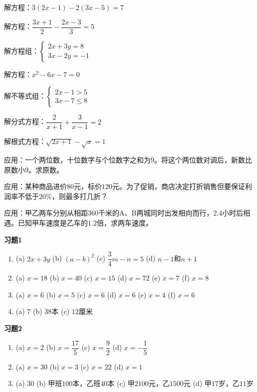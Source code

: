 \documentclass[a4paper,12pt]{ctexart}
\begin{document}
\newpage


\begin{exercise}
\item 解方程：$3(2x-1)-2(3x-5)=7$
\item 解方程：$\dfrac{3x+1}{2}-\dfrac{2x-3}{3}=5$
\item 解方程组：$\begin{cases}2x+3y=8\\3x-2y=-1\end{cases}$
\item 解方程：$x^2-6x-7=0$
\item 解不等式组：$\begin{cases}2x-1>5\\3x-7\le8\end{cases}$
\item 解分式方程：$\dfrac{2}{x+1}+\dfrac{3}{x-1}=2$
\item 解根式方程：$\sqrt{2x+1}-\sqrt{x}=1$
\item 应用：一个两位数，十位数字与个位数字之和为$9$。将这个两位数对调后，新数比原数小$9$。求原数。
\item 应用：某种商品进价$80$元，标价$120$元。为了促销，商店决定打折销售但要保证利润率不低于$20\%$，则最多打几折？
\item 应用：甲乙两车分别从相距$360$千米的A、B两城同时出发相向而行，$2.4$小时后相遇。已知甲车速度是乙车的$1.2$倍，求两车速度。
\end{exercise}

\newpage
{}

\textbf{习题1}
\begin{enumerate}
\item[(1)] (a) $2x+3y$ \qquad (b) $(a-b)^2$ \qquad (c) $\dfrac34m-n=5$ \qquad (d) $n-1$和$n+1$
\item[(2)] (a) $x=18$ \qquad (b) $x=40$ \qquad (c) $x=15$ \qquad (d) $x=72$ \qquad (e) $x=7$ \qquad (f) $x=8$
\item[(3)] (a) $x=6$ \qquad (b) $x=5$ \qquad (c) $x=6$ \qquad (d) $x=6$ \qquad (e) $x=4$ \qquad (f) $x=6$
\item[(4)] (a) $7$ \qquad (b) $38$本 \qquad (c) $12$厘米
\end{enumerate}

\textbf{习题2}
\begin{enumerate}
\item[(1)] (a) $x=2$ \qquad (b) $x=\dfrac{17}{5}$ \qquad (c) $x=\dfrac92$ \qquad (d) $x=-\dfrac15$
\item[(2)] (a) $x=30$ \qquad (b) $x=3$ \qquad (c) $x=22$ \qquad (d) $x=1$
\item[(3)] (a) $30$ \qquad (b) 甲班$100$本，乙班$40$本 \qquad (c) 甲$2100$元，乙$1500$元 \qquad (d) 甲$17$岁，乙$11$岁
\end{enumerate}
\end{document}
